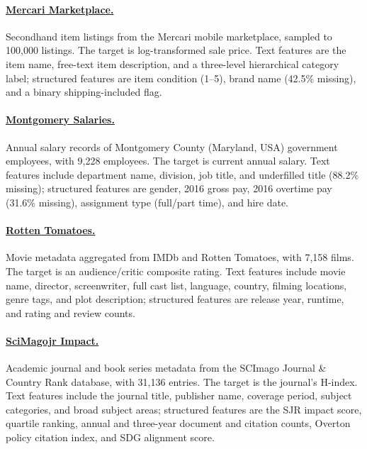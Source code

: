 \paragraph{\href{https://www.openml.org/search?type=data&id=46660}{Mercari Marketplace.}}
Secondhand item listings from the Mercari mobile marketplace, sampled to 100,000 listings.
The target is log-transformed sale price.
Text features are the item name, free-text item description, and a three-level hierarchical category label; structured features are item condition (1--5), brand name (42.5\% missing), and a binary shipping-included flag.

\paragraph{\href{https://www.openml.org/search?type=data&id=42125}{Montgomery Salaries.}}
Annual salary records of Montgomery County (Maryland, USA) government employees, with 9,228 employees.
The target is current annual salary.
Text features include department name, division, job title, and underfilled title (88.2\% missing); structured features are gender, 2016 gross pay, 2016 overtime pay (31.6\% missing), assignment type (full/part time), and hire date.

\paragraph{\href{http://pages.cs.wisc.edu/~anhai/data/784_data/movies1/}{Rotten Tomatoes.}}
Movie metadata aggregated from IMDb and Rotten Tomatoes, with 7,158 films.
The target is an audience/critic composite rating.
Text features include movie name, director, screenwriter, full cast list, language, country, filming locations, genre tags, and plot description; structured features are release year, runtime, and rating and review counts.

\paragraph{\href{https://www.scimagojr.com/journalrank.php}{SciMagojr Impact.}}
Academic journal and book series metadata from the SCImago Journal \& Country Rank database, with 31,136 entries.
The target is the journal's H-index.
Text features include the journal title, publisher name, coverage period, subject categories, and broad subject areas; structured features are the SJR impact score, quartile ranking, annual and three-year document and citation counts, Overton policy citation index, and SDG alignment score.

